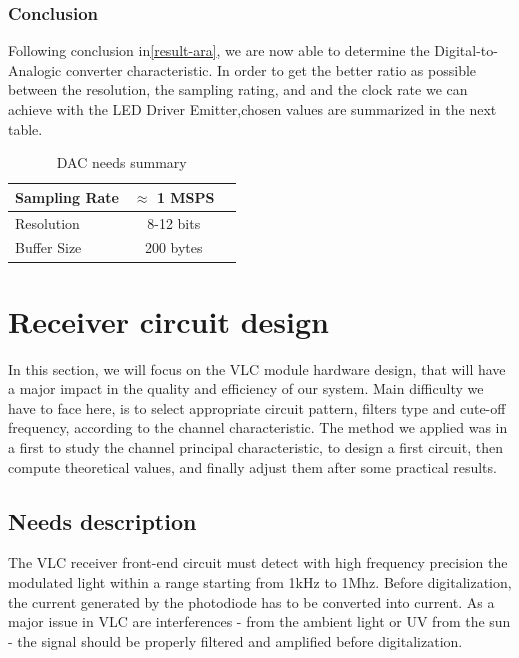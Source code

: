 \subsubsection{Conclusion}
{
Following conclusion in\ref{result-ara}, we are now able to determine the Digital-to-Analogic converter characteristic. In order to get the better ratio as possible between the resolution, the sampling rating, and and the clock rate we can achieve with the LED Driver Emitter,chosen values are summarized in the next table.

\begin{table}[htbp]
\begin{center}
\begin{tabular}{|l|c|r|}
  \hline
  Sampling Rate & $\approx$ 1 MSPS \\
  \hline
  Resolution & 8-12 bits \\
  \hline
  Buffer Size & 200 bytes\\
  \hline
\end{tabular}
\end{center}
\caption{DAC needs summary}
\label{tab:conclusion-adc}
\end{table}
}


\section{Receiver circuit design}

In this section, we will focus on the VLC module hardware design, that will have a major impact in the quality and efficiency of our system. Main difficulty we have to face here, is to select appropriate circuit pattern, filters type and cute-off frequency, according to the channel characteristic. The method we applied was in a first to study the channel principal characteristic, to design a first circuit, then compute theoretical values, and finally adjust them after some practical results. 

\subsection{Needs description}

The VLC receiver front-end circuit must detect with high frequency precision the modulated light within a range starting from 1kHz to 1Mhz. Before digitalization, the current generated by the photodiode has to be converted into current.
As a major issue in VLC are interferences - from the ambient light or UV from the sun - the signal should be properly filtered and amplified before digitalization.


